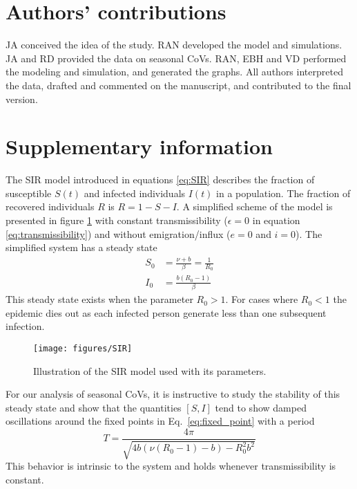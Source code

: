 \documentclass[rmp, reprint, superscriptaddress, floatfix,amsmath]{revtex4-1}
\begin{document}
\section*{Authors' contributions}
JA conceived the idea of the study. RAN developed the model and simulations. JA and RD provided the data on seasonal CoVs. RAN, EBH and VD performed the modeling and simulation, and generated the graphs. All authors interpreted the data, drafted and commented on the manuscript, and contributed to the final version. 



\newpage

\appendix
\setcounter{figure}{0}
\renewcommand{\figurename}{Figure S}
\setcounter{table}{0}
\renewcommand{\tablename}{Table S}

\section*{Supplementary information}

The SIR model introduced in equations \ref{eq:SIR} describes the fraction of susceptible $S(t)$ and infected individuals $I(t)$ in a population. 
The fraction of recovered individuals $R$ is $R=1 - S - I$. 
A simplified scheme of the model is presented in figure \ref{fig:schemeSIR} with constant transmissibility ($\epsilon=0$ in equation \ref{eq:transmissibility}) and without emigration/influx ($e=0$ and $i=0$).
The simplified system has a steady state
\begin{equation}
\begin{split}
S_0 &= \frac{\nu + b}{\beta} = \frac{1}{R_0} \\
I_0 & = \frac{b(R_0-1)}{\beta}
\end{split}
\label{eq:fixed_point}
\end{equation}
This steady state exists when the parameter $R_0 > 1$. For cases where $R_0 < 1$ the epidemic dies out as each infected person generate less than one subsequent infection. 

\begin{figure}[htb]
	\centering
	\texttt{[image: figures/SIR]}
	\caption{Illustration of the SIR model used with its parameters.}\label{fig:schemeSIR}
\end{figure}


For our analysis of seasonal CoVs, it is instructive to study the stability of this steady state and show that the quantities $[S,I]$ tend to show damped oscillations around the fixed points in Eq.~\ref{eq:fixed_point} with a period
\begin{equation}
T = \frac{4\pi}{\sqrt{4b(\nu(R_0-1) - b) - R_0^2b^2}}
\label{eq:period}
\end{equation}
This behavior is intrinsic to the system and holds whenever transmissibility is constant.
\end{document}
